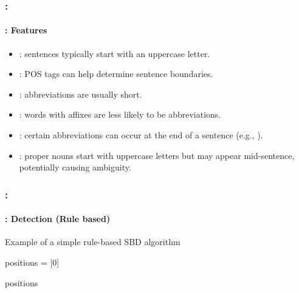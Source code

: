\documentclass[xcolor=table]{beamer}
\begin{document}
\begin{frame}
	\frametitle{\insertshortsubtitle: \insertsection}
	\framesubtitle{\insertsubsection: Features} 

	\begin{itemize}
		\item {}: sentences typically start with an uppercase letter.
		\item {}: POS tags can help determine sentence boundaries.
		\item {}: abbreviations are usually short.
		\item {}: words with affixes are less likely to be abbreviations.
		\item {}: certain abbreviations can occur at the end of a sentence (e.g., ).
		\item {}: proper nouns start with uppercase letters but may appear mid-sentence, potentially causing ambiguity.
	\end{itemize}

\end{frame}

\begin{frame}
	\frametitle{\insertshortsubtitle: \insertsection}
	\framesubtitle{\insertsubsection: Detection (Rule based)} 
	
	\vskip-3pt
	\begin{exampleblock}{Example of a simple rule-based SBD algorithm}
		\tiny
		\begin{algorithm}[H]
			\vskip-3pt
			
			positions = [0]\;
			
			
			\Return positions\;
			
		\end{algorithm}
	\end{exampleblock}
	
\end{frame}
\end{document}

